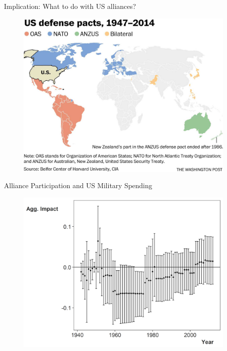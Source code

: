 \documentclass{beamer}
\begin{document}
\begin{frame}{Implication: What to do with US alliances?}

\begin{figure}[htbp]
	\centering
		\includegraphics[width=0.95\textwidth]{nato-map.jpg}
\end{figure}


\end{frame}



\begin{frame}{Alliance Participation and US Military Spending}

\begin{figure}[htbp]
	\centering
		\includegraphics[width=0.95\textwidth]{us-agg-imp.png}
\end{figure}

\end{frame}
\end{document}
